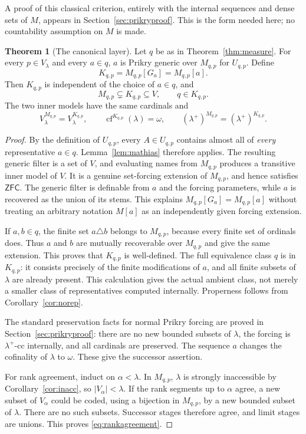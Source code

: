 \documentclass[11pt,letterpaper]{article}
\theoremstyle{definition}
\newtheorem{theorem}[definition]{Theorem}
\numberwithin{equation}{section}
\newcommand{\ZFC}{\mathsf{ZFC}}
\newcommand{\cf}{\operatorname{cf}}
\begin{document}
A proof of this classical criterion, entirely with the internal
sequences and dense sets of $M$, appears in
Section~\ref{sec:prikryproof}. This is the form needed here; no
countability assumption on $M$ is made.

\begin{theorem}[The canonical layer]\label{thm:layer}
Let $q$ be as in Theorem~\ref{thm:measure}. For every $p\in V_\lambda$ and
every $a\in q$, $a$ is Prikry generic over $M_{q,p}$ for $U_{q,p}$.
Define
\[
 K_{q,p}=M_{q,p}[G_a]=M_{q,p}[a].
\]
Then $K_{q,p}$ is independent of the choice of $a\in q$, and
\[
 M_{q,p}\subsetneq K_{q,p}\subseteq V,\qquad q\in K_{q,p}.
\]
The two inner models have the same cardinals and
\begin{equation}\label{eq:rankagreement}
 V_\lambda^{M_{q,p}}=V_\lambda^{K_{q,p}},
 \qquad
 \cf^{K_{q,p}}(\lambda)=\omega,
 \qquad
 (\lambda^+)^{M_{q,p}}=(\lambda^+)^{K_{q,p}}.
\end{equation}
\end{theorem}

\begin{proof}
By the definition of $U_{q,p}$, every $A\in U_{q,p}$ contains almost
all of \emph{every} representative $a\in q$.
Lemma~\ref{lem:mathias} therefore applies. The resulting generic filter
is a set of $V$, and evaluating names from $M_{q,p}$ produces a
transitive inner model of $V$. It is a genuine set-forcing extension
of $M_{q,p}$, and hence satisfies $\ZFC$.
The generic filter is definable from $a$ and the forcing parameters,
while $a$ is recovered as the union of its stems. This explains
$M_{q,p}[G_a]=M_{q,p}[a]$ without treating an arbitrary notation
$M[a]$ as an independently given forcing extension.

If $a,b\in q$, the finite set $a\triangle b$ belongs to $M_{q,p}$,
because every finite set of ordinals does. Thus $a$ and $b$ are mutually
recoverable over $M_{q,p}$ and give the same extension. This proves
that $K_{q,p}$ is well-defined. The full equivalence class $q$ is in
$K_{q,p}$: it consists precisely of the finite modifications of $a$,
and all finite subsets of $\lambda$ are already present. This
calculation gives the actual ambient class, not merely a smaller
class of representatives computed internally. Properness follows
from Corollary~\ref{cor:norep}.

The standard preservation facts for normal Prikry forcing are proved
in Section~\ref{sec:prikryproof}: there are no new bounded subsets of
$\lambda$, the forcing is $\lambda^+$-cc internally, and all cardinals
are preserved. The sequence $a$ changes the cofinality of $\lambda$
to $\omega$. These give the successor assertion.

For rank agreement, induct on $\alpha<\lambda$. In $M_{q,p}$,
$\lambda$ is strongly inaccessible by Corollary~\ref{cor:inacc}, so
$|V_\alpha|<\lambda$. If the rank segments up to $\alpha$ agree, a new
subset of $V_\alpha$ could be coded, using a bijection in $M_{q,p}$,
by a new bounded subset of $\lambda$. There are no such subsets.
Successor stages therefore agree, and limit stages are unions.
This proves \eqref{eq:rankagreement}.
\end{proof}
\end{document}
